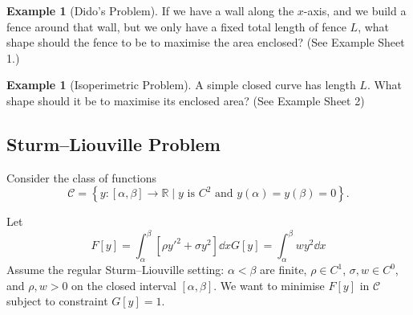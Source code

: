 \documentclass[11pt]{article}
\numberwithin{equation}{section}
\theoremstyle{definition}
\newtheorem{example}[theorem]{Example}
\theoremstyle{remark}
\newcommand{\pqty}[1]{\left(#1\right)}
\newcommand{\bqty}[1]{\left[#1\right]}
\newcommand{\set}[2]{\left\{#1\mid #2\right\}}
\newcommand{\ccintv}[2]{[#1,#2]}
\newcommand{\functiondomain}[3]{#1:#2\to #3}
\newcommand{\RR}{\mathbb{R}}
\newcommand{\contClass}[1]{C^{#1}}
\newcommand{\contClassSymb}{\mathcal{C}}
\begin{document}
\begin{example}[Dido's Problem]\label{variation-unit-0051}
    If we have a wall along the \(x\)-axis, and we build a fence around that wall, but we only have a fixed total length of fence \(L\), what shape should the fence to be to maximise the area enclosed? (See Example Sheet 1.)
\end{example}

\begin{example}[Isoperimetric Problem]\label{variation-unit-0052}
    A simple closed curve has length \(L\). What shape should it be to maximise its enclosed area? (See Example Sheet 2)
\end{example}

\subsection{Sturm--Liouville Problem}

Consider the class of functions
\[
    \contClassSymb = \set{\functiondomain{y}{\ccintv{\alpha}{\beta}}{\RR}}{y \text{ is }\contClass{2}\text{ and }y\pqty{\alpha} = y\pqty{\beta} = 0}.
\]

Let
\begin{subequations}
    \label{eq:sturm-liouville}%
    \begin{equation}
        F\bqty{y} = \int_{\alpha}^{\beta} \bqty{\rho y'^2 + \sigma y^2} \dd{x}
    \end{equation}
    \begin{equation}
        G\bqty{y} = \int_{\alpha}^{\beta} w y^2 \dd{x}
    \end{equation}
\end{subequations}
Assume the regular Sturm--Liouville setting: \(\alpha<\beta\) are finite, \(\rho\in C^1\), \(\sigma,w\in C^0\), and \(\rho,w>0\) on the closed interval \([\alpha,\beta]\). We want to minimise \(F\bqty{y}\) in \(\contClassSymb\) subject to constraint \(G\bqty{y} = 1\).
\end{document}
